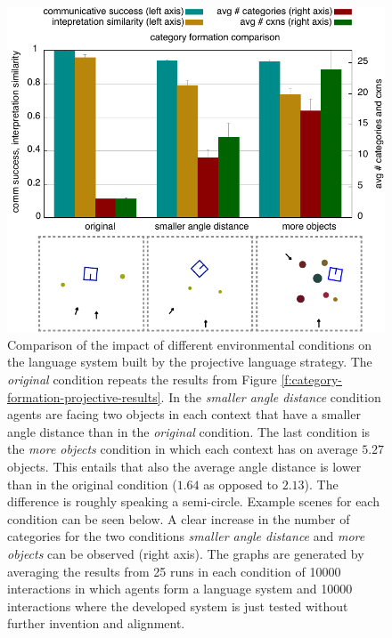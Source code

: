 \begin{figure}
\begin{center}
\includegraphics[width=1.0\columnwidth]{figs/category-formation-projective-compare-original-smaller-angle-more-objects}
\end{center}
\caption[Impact of different environmental conditions on 
projective systems]{%
Comparison of the impact of different environmental conditions on the language
system built by the projective language strategy. The \emph{original} condition repeats the results 
from Figure \ref{f:category-formation-projective-results}. In the \emph{smaller angle distance} condition
agents are facing two objects in each context that have a smaller angle distance than in the
\emph{original} condition. The last condition is the \emph{more objects} condition in which each context has 
on average $5.27$ objects. This entails that also the average angle distance is lower than in the original condition 
($1.64$ as opposed to $2.13$). The difference is roughly speaking a semi-circle.
Example scenes for each condition can be seen below.
A clear increase in the number of categories for the two conditions \emph{smaller angle distance} and 
\emph{more objects} can be observed (right axis). The graphs are generated by averaging the results 
from 25 runs in each condition of 10000 interactions in which agents form a language system and 10000
interactions where the developed system is just tested without further invention and alignment.}
\label{f:compare-original-smaller-angle-more-objects}
\end{figure}


